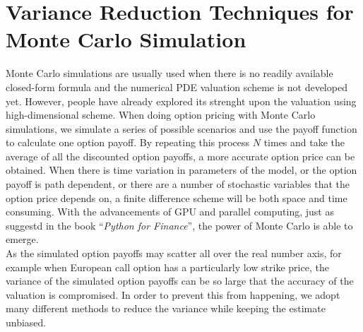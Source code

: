\section{Variance Reduction Techniques for Monte Carlo Simulation}
Monte Carlo simulations are usually used when there is no readily available closed-form formula and the numerical PDE valuation scheme is not developed yet. However, people have already explored its strenght upon the valuation using high-dimensional scheme. When doing option pricing with Monte Carlo simulations, we simulate a series of possible scenarios and use the payoff function to calculate one option payoff. By repeating this process $N$ times and take the average of all the discounted option payoffs, a more accurate option price can be obtained. When there is time variation in parameters of the model, or the option payoff is path dependent, or there are a number of stochastic variables that the option price depends on, a finite difference scheme will be both space and time consuming. With the advancements of GPU and parallel computing, just as suggestd in the book ``\emph{Python for Finance}''\cite{PythonForFinance}, the power of Monte Carlo is able to emerge.\\[3mm]
As the simulated option payoffs may scatter all over the real number axis, for example when European call option has a particularly low strike price, the variance of the simulated option payoffs can be so large that the accuracy of the valuation is compromised. In order to prevent this from happening, we adopt many different methods to reduce the variance while keeping the estimate unbiased. \cite{VarianceReduction}
\newpage
